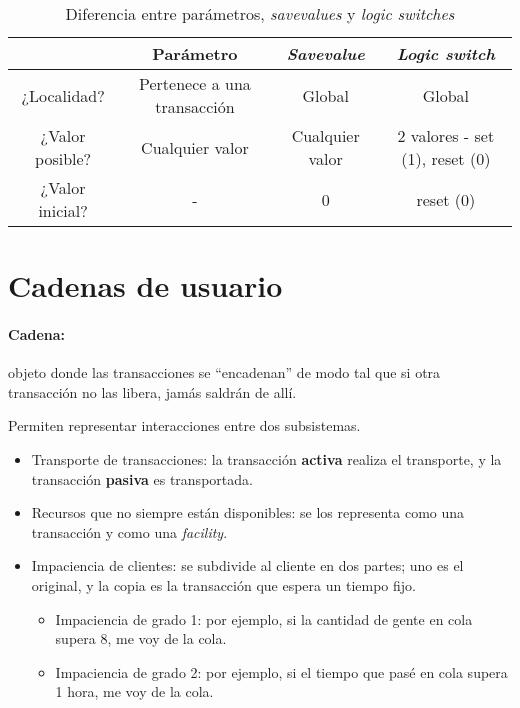 \documentclass[12pt, a4paper, twoside]{paquetes-apunte/apunte}
\providecommand{\tabularnewline}{\\}
\begin{document}
\begin{table}[h]
  \centering
  \begin{tabular}{|c|c|c|c|}
    \hline
    & \textbf{Parámetro} & \textbf{\emph{Savevalue}} & \textbf{\emph{Logic switch}} \tabularnewline
    \hline
    \hline
    ¿Localidad? & Pertenece a una transacción & Global & Global \tabularnewline
    \hline
    ¿Valor posible? & Cualquier valor & Cualquier valor & 2 valores - set (1), reset (0) \tabularnewline
    \hline
    ¿Valor inicial? & - & 0 & reset (0) \tabularnewline
    \hline
  \end{tabular}
  \caption{Diferencia entre parámetros, \emph{savevalues} y \emph{logic switches}}
\end{table}

\newpage

\section{Cadenas de usuario}

\paragraph{Cadena:} objeto donde las transacciones se ``encadenan''
de modo tal que si otra transacción no las libera, jamás saldrán de
allí.

Permiten representar interacciones entre dos subsistemas.

\begin{itemize}
  \item Transporte de transacciones: la transacción \textbf{activa} realiza
    el transporte, y la transacción \textbf{pasiva} es transportada.
  \item Recursos que no siempre están disponibles: se los representa como
    una transacción y como una \emph{facility}.
  \item Impaciencia de clientes: se subdivide al cliente en dos partes; uno
    es el original, y la copia es la transacción que espera un tiempo fijo.
  \begin{itemize}
    \item Impaciencia de grado 1: por ejemplo, si la cantidad de gente en cola
      supera 8, me voy de la cola.
    \item Impaciencia de grado 2: por ejemplo, si el tiempo que pasé en cola
      supera 1 hora, me voy de la cola.
  \end{itemize}
\end{itemize}
\end{document}
